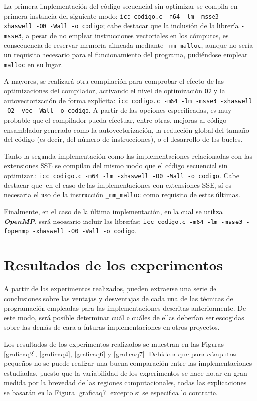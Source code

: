 \documentclass[conference]{IEEEtran}
\begin{document}
La primera implementación del código secuencial sin optimizar se compila en primera instancia del siguiente modo: \texttt{icc codigo.c -m64 -lm -msse3 -xhaswell -O0 -Wall -o codigo}; cabe destacar que la inclusión de la librería \texttt{-msse3}, a pesar de no emplear instrucciones vectoriales en los cómputos, es consecuencia de reservar memoria alineada mediante \texttt{\_mm\_malloc}, aunque no sería un requisito necesario para el funcionamiento del programa, pudiéndose emplear \texttt{malloc} en su lugar.

A mayores, se realizará otra compilación para comprobar el efecto de las optimizaciones del compilador, activando el nivel de optimización \texttt{O2} y la autovectorización de forma explícita: \texttt{icc codigo.c -m64 -lm -msse3 -xhaswell -O2 -vec -Wall -o codigo}. A partir de las opciones especificadas, es muy probable que el compilador pueda efectuar, entre otras, mejoras al código ensamblador generado como la autovectorización, la reducción global del tamaño del código (es decir, del número de instrucciones), o el desarrollo de los bucles.

Tanto la segunda implementación como las implementaciones relacionadas con las extensiones SSE se compilan del mismo modo que el código secuencial sin optimizar.: \texttt{icc codigo.c -m64 -lm -xhaswell -O0 -Wall -o codigo}. Cabe destacar que, en el caso de las implementaciones con extensiones SSE, sí es necesaria el uso de la instrucción \texttt{\_mm\_malloc} como requisito de estas últimas.

Finalmente, en el caso de la última implementación, en la cual se utiliza \textit{\textbf{OpenMP}}, será necesario incluir las librerías: \texttt{icc codigo.c -m64 -lm -msse3 -fopenmp -xhaswell -O0 -Wall -o codigo}.

\section{Resultados de los experimentos} \label{resumenExperimentos}

A partir de los experimentos realizados, pueden extraerse una serie de conclusiones sobre las ventajas y desventajas de cada una de las técnicas de programación empleadas para las implementaciones descritas anteriormente. De este modo, será posible determinar cuál o cuáles de ellas deberían ser escogidas sobre las demás de cara a futuras implementaciones en otros proyectos.

Los resultados de los experimentos realizados se muestran en las Figuras \ref{graficaq2}, \ref{graficaq4}, \ref{graficaq6} y \ref{graficaq7}. Debido a que para cómputos pequeños no se puede realizar una buena comparación entre las implementaciones estudiadas, puesto que la variabilidad de los experimentos se hace notar en gran medida por la brevedad de las regiones computacionales, todas las explicaciones se basarán en la Figura \ref{graficaq7} excepto si se especifica lo contrario.
\end{document}
